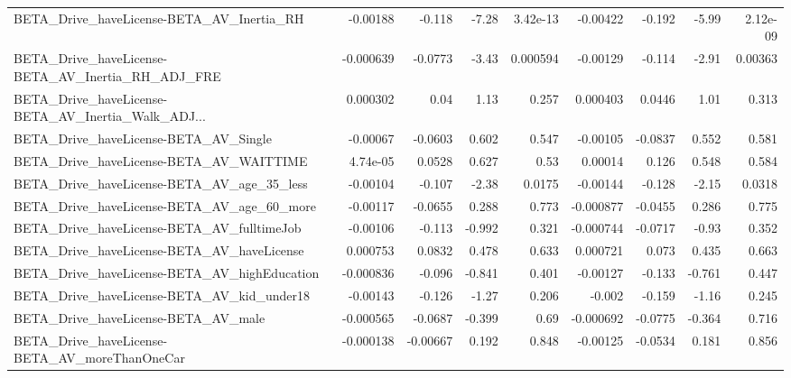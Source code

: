 \begin{tabular}{lrrrrrrrr}
BETA\_Drive\_haveLicense-BETA\_AV\_Inertia\_RH          &    -0.00188 &       -0.118 &    -7.28 & 3.42e-13 &   -0.00422 &      -0.192 &        -5.99 &      2.12e-09 \\
BETA\_Drive\_haveLicense-BETA\_AV\_Inertia\_RH\_ADJ\_FRE  &   -0.000639 &      -0.0773 &    -3.43 & 0.000594 &   -0.00129 &      -0.114 &        -2.91 &       0.00363 \\
BETA\_Drive\_haveLicense-BETA\_AV\_Inertia\_Walk\_ADJ... &    0.000302 &         0.04 &     1.13 &    0.257 &   0.000403 &      0.0446 &         1.01 &         0.313 \\
BETA\_Drive\_haveLicense-BETA\_AV\_Single              &    -0.00067 &      -0.0603 &    0.602 &    0.547 &   -0.00105 &     -0.0837 &        0.552 &         0.581 \\
BETA\_Drive\_haveLicense-BETA\_AV\_WAITTIME            &    4.74e-05 &       0.0528 &    0.627 &     0.53 &    0.00014 &       0.126 &        0.548 &         0.584 \\
BETA\_Drive\_haveLicense-BETA\_AV\_age\_35\_less         &    -0.00104 &       -0.107 &    -2.38 &   0.0175 &   -0.00144 &      -0.128 &        -2.15 &        0.0318 \\
BETA\_Drive\_haveLicense-BETA\_AV\_age\_60\_more         &    -0.00117 &      -0.0655 &    0.288 &    0.773 &  -0.000877 &     -0.0455 &        0.286 &         0.775 \\
BETA\_Drive\_haveLicense-BETA\_AV\_fulltimeJob         &    -0.00106 &       -0.113 &   -0.992 &    0.321 &  -0.000744 &     -0.0717 &        -0.93 &         0.352 \\
BETA\_Drive\_haveLicense-BETA\_AV\_haveLicense         &    0.000753 &       0.0832 &    0.478 &    0.633 &   0.000721 &       0.073 &        0.435 &         0.663 \\
BETA\_Drive\_haveLicense-BETA\_AV\_highEducation       &   -0.000836 &       -0.096 &   -0.841 &    0.401 &   -0.00127 &      -0.133 &       -0.761 &         0.447 \\
BETA\_Drive\_haveLicense-BETA\_AV\_kid\_under18         &    -0.00143 &       -0.126 &    -1.27 &    0.206 &     -0.002 &      -0.159 &        -1.16 &         0.245 \\
BETA\_Drive\_haveLicense-BETA\_AV\_male                &   -0.000565 &      -0.0687 &   -0.399 &     0.69 &  -0.000692 &     -0.0775 &       -0.364 &         0.716 \\
BETA\_Drive\_haveLicense-BETA\_AV\_moreThanOneCar      &   -0.000138 &     -0.00667 &    0.192 &    0.848 &   -0.00125 &     -0.0534 &        0.181 &         0.856 \\

\end{tabular}
